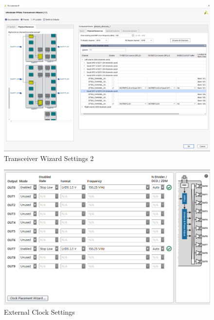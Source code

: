\documentclass[oneside]{discothesis}
\begin{document}
\begin{figure}[t]
    \centering
    \hspace*{-2cm}\includegraphics[width=1.3\linewidth]{img/transceiver2.png}
    \caption{Transceiver Wizard Settings 2}%
    \label{fig:transceiver2}
\end{figure}

\cleardoublepage

\begin{figure}[t]
    \centering
    \hspace*{-2cm}\includegraphics[width=1.3\linewidth]{img/clock_settings.png}
    \caption{External Clock Settings}%
    \label{fig:clock_settings}
\end{figure}

\cleardoublepage
\end{document}
